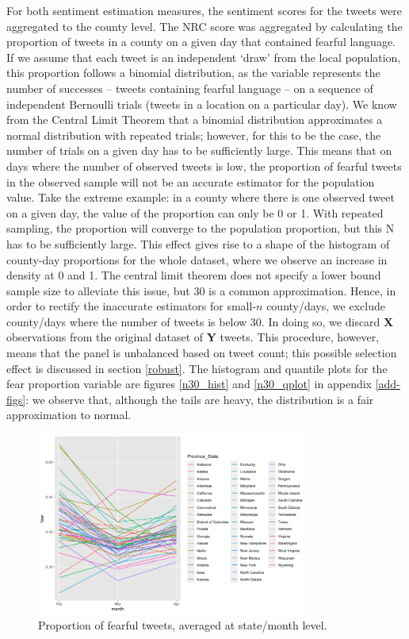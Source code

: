 \documentclass{article}
\begin{document}
For both sentiment estimation measures, the sentiment scores for the tweets were aggregated to the county level. The NRC score was aggregated by calculating the proportion of tweets in a county on a given day that contained fearful language. If we assume that each tweet is an independent `draw' from the local population, this proportion follows a  binomial distribution, as the variable represents the number of successes -- tweets containing fearful language -- on a sequence of independent Bernoulli trials (tweets in a location on a particular day). We know from the Central Limit Theorem that a binomial distribution approximates a normal distribution with repeated trials; however, for this to be the case, the number of trials on a given day has to be sufficiently large. This means that on days  where the number of observed tweets is low, the proportion of fearful tweets in the observed sample will not be an accurate estimator for the population value. Take the extreme example: in a county where there is one observed tweet on a given day, the value of the proportion can only be 0 or 1. With repeated sampling, the proportion will converge to the population proportion, but this N has to be sufficiently large. This effect gives rise to a shape of the histogram of county-day proportions for the whole dataset, where we observe an increase in density at 0 and 1. The central limit theorem does not specify a lower bound sample size to alleviate this issue, but 30 is a common approximation. Hence, in order to rectify the inaccurate estimators for small-\(n\) county/days, we exclude county/days where the number of tweets is below 30. In doing so, we discard \textbf{X} observations from the original dataset of \textbf{Y} tweets. This procedure, however, means that the panel is unbalanced based on tweet count; this possible selection effect is discussed in section \ref{robust}. The histogram and quantile plots for the fear proportion variable are figures \ref{n30_hist} and \ref{n30_qplot} in appendix \ref{add-figs}: we observe that, although the tails are heavy, the distribution is a fair approximation to normal.

\begin{figure}[h!]
  \includegraphics[width=0.8\textwidth]{figs/sent_time.png}    
  \centering
  \caption{Proportion of fearful tweets, averaged at state/month level.}
  \label{sent_time}
\end{figure}
\end{document}
